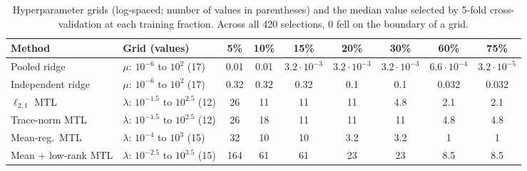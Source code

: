 \begin{table}[h]
\centering
\caption{Hyperparameter grids (log-spaced; number of values in parentheses) and the median value selected by 5-fold cross-validation at each training fraction. Across all 420 selections, 0 fell on the boundary of a grid.}
\label{tab:hyper}
\footnotesize
\setlength{\tabcolsep}{3.2pt}
\begin{tabular}{@{}llccccccc@{}}
\toprule
Method & Grid (values) & 5\% & 10\% & 15\% & 20\% & 30\% & 60\% & 75\% \\
\midrule
Pooled ridge & $\mu$: $10^{-6}$ to $10^{2}$ (17) & 0.01 & 0.01 & $3.2\cdot 10^{-3}$ & $3.2\cdot 10^{-3}$ & $3.2\cdot 10^{-3}$ & $6.6\cdot 10^{-4}$ & $3.2\cdot 10^{-5}$ \\
Independent ridge & $\mu$: $10^{-6}$ to $10^{2}$ (17) & 0.32 & 0.32 & 0.32 & 0.1 & 0.1 & 0.032 & 0.032 \\
$\ell_{2,1}$ MTL & $\lambda$: $10^{-1.5}$ to $10^{2.5}$ (12) & 26 & 11 & 11 & 11 & 4.8 & 2.1 & 2.1 \\
Trace-norm MTL & $\lambda$: $10^{-1.5}$ to $10^{2.5}$ (12) & 26 & 18 & 11 & 11 & 11 & 4.8 & 4.8 \\
Mean-reg.\ MTL & $\lambda$: $10^{-4}$ to $10^{3}$ (15) & 32 & 10 & 10 & 3.2 & 3.2 & 1 & 1 \\
Mean + low-rank MTL & $\lambda$: $10^{-2.5}$ to $10^{3.5}$ (15) & 164 & 61 & 61 & 23 & 23 & 8.5 & 8.5 \\
\bottomrule
\end{tabular}
\end{table}
